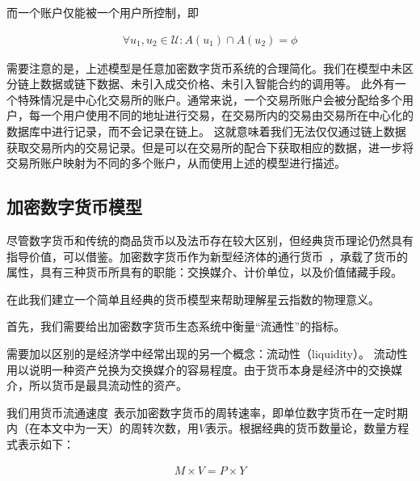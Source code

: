 \noindent 而一个账户仅能被一个用户所控制，即

\begin{align}
\forall u_1, u_2 \in \mathcal{U} : A(u_1) \cap A(u_2) = \phi
\end{align}

需要注意的是，上述模型是任意加密数字货币系统的合理简化。我们在模型中未区分链上数据或链下数据、未引入成交价格、未引入智能合约的调用等。
此外有一个特殊情况是中心化交易所的账户。通常来说，一个交易所账户会被分配给多个用户，每一个用户使用不同的地址进行交易，在交易所内的交易由交易所在中心化的数据库中进行记录，而不会记录在链上。
这就意味着我们无法仅仅通过链上数据获取交易所内的交易记录。但是可以在交易所的配合下获取相应的数据，进一步将交易所账户映射为不同的多个账户，从而使用上述的模型进行描述。



\subsection{加密数字货币模型}
尽管数字货币和传统的商品货币以及法币存在较大区别，但经典货币理论仍然具有指导价值，可以借鉴。加密数字货币作为新型经济体的通行货币~\cite{swan2015blockchain}，承载了货币的属性，具有三种货币所具有的职能：交换媒介、计价单位，以及价值储藏手段。


在此我们建立一个简单且经典的货币模型来帮助理解星云指数的物理意义。

首先，我们需要给出加密数字货币生态系统中衡量“流通性”的指标。

需要加以区别的是经济学中经常出现的另一个概念：流动性（liquidity）。
流动性用以说明一种资产兑换为交换媒介的容易程度。由于货币本身是经济中的交换媒介，所以货币是最具流动性的资产。



我们用货币流通速度~\cite{selden}表示加密数字货币的周转速率，即单位数字货币在一定时期内（在本文中为一天）的周转次数，用$V$表示。根据经典的货币数量论，数量方程式表示如下：

\begin{align}
M\times V=P\times Y
\label{eq:currency}
\end{align}

